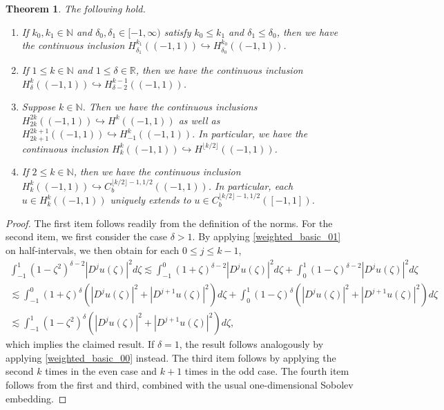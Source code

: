 \documentclass[11pt,reqno]{amsart}
\numberwithin{equation}{section}
\providecommand{\abs}[1]{\left\vert#1\right\vert}
\providecommand{\abs}[1]{\left\vert#1\right\vert}
\def\N{\mathbb{N}}
\def\R{\mathbb{R}}
\newtheorem{thm}[lem]{Theorem}
\begin{document}
\begin{thm}\label{weighted_space_properties}
The following hold.
\begin{enumerate}
 \item If $k_0,k_1 \in \N$ and $\delta_0,\delta_1 \in [-1,\infty)$ satisfy $k_0 \le k_1$ and $\delta_1 \le \delta_0$, then we have the continuous inclusion $H^{k_1}_{\delta_1}((-1,1)) \hookrightarrow H^{k_0}_{\delta_0}((-1,1))$. 
 \item If $1\le k \in \N$ and $1 \le \delta \in \R$, then we have the continuous inclusion $H^k_\delta((-1,1)) \hookrightarrow H^{k-1}_{\delta-2}((-1,1))$.
 \item Suppose $k \in \N$.  Then we have the continuous inclusions $H^{2k}_{2k}((-1,1)) \hookrightarrow H^k((-1,1))$ as well as $H^{2k+1}_{2k+1}((-1,1)) \hookrightarrow H^k_{-1}((-1,1))$.  In particular, we have the continuous inclusion $H^k_k((-1,1)) \hookrightarrow H^{\lfloor k/2\rfloor}((-1,1))$.
 \item If $2\le k \in \N$, then we have the continuous inclusion $H^{k}_{k}((-1,1)) \hookrightarrow C^{\lfloor k/2\rfloor -1, 1/2}_b((-1,1))$.  In particular, each $u \in H^{k}_{k}((-1,1))$ uniquely extends to $u \in C^{\lfloor k/2\rfloor -1, 1/2}_b([-1,1])$.
\end{enumerate}
\end{thm}
\begin{proof}
The first item follows readily from the definition of the norms.  For the second item, we first consider the case $\delta >1$. By applying \eqref{weighted_basic_01} on half-intervals, we then obtain for each $0 \le j \le k-1$, 
\begin{multline}
 \int_{-1}^1 (1-\zeta^2)^{\delta-2} \abs{ D^j u (\zeta)}^2 d\zeta  \lesssim \int_{-1}^0 (1+\zeta)^{\delta-2} \abs{ D^j u(\zeta) }^2 d\zeta + \int_{0}^1 (1-\zeta)^{\delta-2} \abs{ D^j u(\zeta) }^2 d\zeta \\
 \lesssim \int_{-1}^0 (1+\zeta)^{\delta} ( \abs{ D^j u (\zeta)}^2 +  \abs{D^{j+1} u (\zeta)}^2  )d\zeta + \int_{0}^1 (1-\zeta)^{\delta} (\abs{ D^j u (\zeta)}^2 + \abs{D^{j+1} u(\zeta) }^2 )d\zeta  \\
 \lesssim \int_{-1}^1 (1-\zeta^2)^{\delta} (\abs{ D^j u(\zeta) }^2 + \abs{D^{j+1} u(\zeta)}^2 )d\zeta,
\end{multline}
which implies the claimed result. If $\delta=1$, the result follows analogously by applying \eqref{weighted_basic_00} instead. 
The third item follows by applying the second $k$ times in the even case and $k+1$ times in the odd case.  The fourth item follows from the first and third,  combined with the usual one-dimensional Sobolev embedding.
\end{proof}
\end{document}
